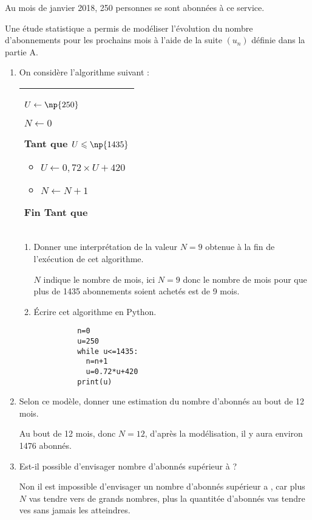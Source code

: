 \documentclass[12pt,a4paper]{article}
\theoremstyle{break}
\begin{document}
	Au mois de janvier 2018, 250 personnes se sont abonnées à ce service.
	
	Une étude statistique a permis de modéliser l'évolution du nombre d'abonnements pour les prochains mois à l'aide de la suite $\left(u_{n}\right)$ définie dans la partie A.
	
	\begin{enumerate}
		\item On considère l'algorithme suivant :
		\begin{center}
			\begin{tabular}{|l|}
				\hline
					\begin{minipage}{.3\linewidth}
					
					$U \gets \np{250}$
					
					$N \leftarrow  0$
					
					Tant que  $U \leqslant \np{1435}$
					
					\begin{itemize}
						\item[] $U \leftarrow 0,72 \times U + 420$
						\item[] $N \leftarrow N+1$
					\end{itemize}
					Fin Tant que
				\end{minipage}\\
			\hline	
			\end{tabular}
		
				
		\end{center}
		\begin{enumerate}
			\item Donner une interprétation de la valeur $N=9$ obtenue à la fin de l'exécution de cet algorithme.\par
			$N$ indique le nombre de mois, ici $N = 9$ donc le nombre de mois pour que plus de 1435 abonnements soient achetés est de 9 mois.
		\item Écrire cet algorithme en Python.
 \begin{lstlisting}
          n=0
          u=250
          while u<=1435:
            n=n+1
            u=0.72*u+420
          print(u)
        \end{lstlisting}

		\end{enumerate}
	
		\item Selon ce modèle, donner une estimation du nombre d'abonnés au bout de 12 mois.\par
		Au bout de 12 mois, donc $N = 12$, d'après la modélisation, il y aura environ 1476 abonnés.
		\item Est-il possible d'envisager nombre d'abonnés supérieur à  ?\par
		Non il est impossible d'envisager un nombre d'abonnés supérieur a , 
		car plus $N$ vas tendre vers de grands nombres,
		plus la quantitée d'abonnés vas tendre ves  sans jamais les atteindres.
	\end{enumerate}
\end{document}
